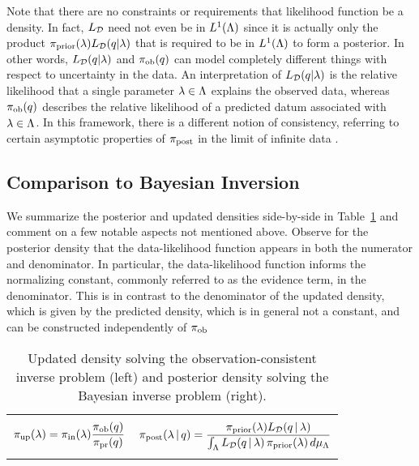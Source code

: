 Note that there are no constraints or requirements that likelihood function be a density.
In fact, $L_{\mathcal{D}}$ need not even be in $L^1({\Lambda})$ since it is actually only the product $\operatorname*{\pi_{prior}}(\lambda) L_{\mathcal{D}} (q | \lambda)$ that is required to be in $L^1({\Lambda})$ to form a posterior.
In other words, $L_{\mathcal{D}} (q | \lambda)$ and $\operatorname*{\pi_{ob}}(q)$ can model completely different things with respect to uncertainty in the data.
An interpretation of $L_{\mathcal{D}} (q | \lambda)$ is the relative likelihood that a single parameter $\lambda\in{\Lambda}$ explains the observed data, whereas $\operatorname*{\pi_{ob}}(q)$ describes the relative likelihood of a predicted datum associated with $\lambda\in{\Lambda}$.
In this framework, there is a different notion of consistency, referring to certain asymptotic properties of $\operatorname*{\pi_{post}}$ in the limit of infinite data \cite{Barron, Silverman}.




\subsection{Comparison to Bayesian Inversion}\label{sec:bayesian}

We summarize the posterior and updated densities side-by-side in Table~\ref{tab:dens_comparisons} and comment on a few notable aspects not mentioned above.
Observe for the posterior density that the data-likelihood function appears in both the numerator and denominator.
In particular, the data-likelihood function informs the {normalizing constant}, commonly referred to as the evidence term, in the denominator.
This is in contrast to the denominator of the updated density, which is given by the predicted density, which is in general not a constant, and can be constructed independently of $\operatorname*{\pi_{ob}}$

\begin{table}[htbp]
\centering
\begin{tabular}{|c|c|}
\hline
 & \\
$\displaystyle \operatorname*{\pi_{up}}(\lambda) = \operatorname*{\pi_{in}}(\lambda) \frac{\operatorname*{\pi_{ob}}(q)}{\operatorname*{\pi_{pr}}(q)}
$
&
$
	\displaystyle \pi_{\text{post}}(\lambda\,|\,q) = \frac{\operatorname*{\pi_{prior}}(\lambda)L_{\mathcal{D}}(q \,|\,\lambda)}{\int_{\Lambda} L_{\mathcal{D}}(q \, |\, \lambda)  \operatorname*{\pi_{prior}}(\lambda) \, d\mu_{{\Lambda}}}
$
 \\ & \\ \hline
\end{tabular}
\caption{Updated density solving the observation-consistent inverse problem (left) and posterior density solving the Bayesian inverse problem (right).}
		\label{tab:dens_comparisons}
\end{table}

